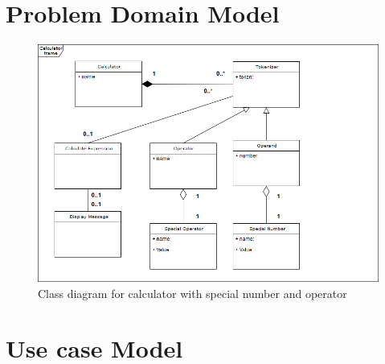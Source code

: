 \documentclass{article}
\begin{document}
\section{Problem Domain Model}
\begin{figure}[htb!]
  
  \includegraphics[width=1\textwidth]{uml}
  \centering
  \caption{Class diagram for calculator with special number and operator}
\end{figure}

\section{Use case Model}
\end{document}
